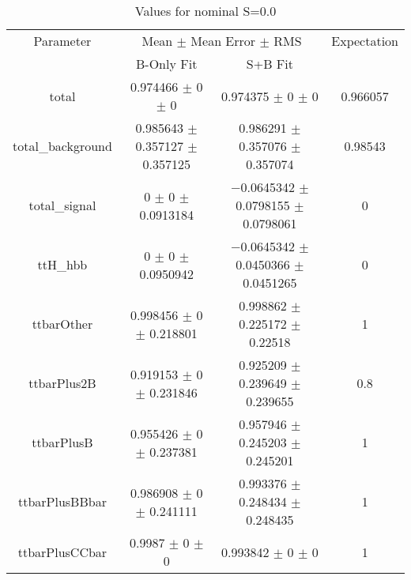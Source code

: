 \begin{table}
\centering
\caption{Values for nominal S=0.0}
\begin{tabular}{cccc}
\toprule
Parameter & \multicolumn{2}{c}{Mean $\pm$ Mean Error $\pm$ RMS} & Expectation\\
 & B-Only Fit & S+B Fit & \\
\midrule
total & \num{0.974466} $\pm$ \num{0} $\pm$ \num{0} & \num{0.974375} $\pm$ \num{0} $\pm$ \num{0} & \num{0.966057}\\
total\_background & \num{0.985643} $\pm$ \num{0.357127} $\pm$ \num{0.357125} & \num{0.986291} $\pm$ \num{0.357076} $\pm$ \num{0.357074} & \num{0.98543}\\
total\_signal & \num{0} $\pm$ \num{0} $\pm$ \num{0.0913184} & \num{-0.0645342} $\pm$ \num{0.0798155} $\pm$ \num{0.0798061} & \num{0}\\
ttH\_hbb & \num{0} $\pm$ \num{0} $\pm$ \num{0.0950942} & \num{-0.0645342} $\pm$ \num{0.0450366} $\pm$ \num{0.0451265} & \num{0}\\
ttbarOther & \num{0.998456} $\pm$ \num{0} $\pm$ \num{0.218801} & \num{0.998862} $\pm$ \num{0.225172} $\pm$ \num{0.22518} & \num{1}\\
ttbarPlus2B & \num{0.919153} $\pm$ \num{0} $\pm$ \num{0.231846} & \num{0.925209} $\pm$ \num{0.239649} $\pm$ \num{0.239655} & \num{0.8}\\
ttbarPlusB & \num{0.955426} $\pm$ \num{0} $\pm$ \num{0.237381} & \num{0.957946} $\pm$ \num{0.245203} $\pm$ \num{0.245201} & \num{1}\\
ttbarPlusBBbar & \num{0.986908} $\pm$ \num{0} $\pm$ \num{0.241111} & \num{0.993376} $\pm$ \num{0.248434} $\pm$ \num{0.248435} & \num{1}\\
ttbarPlusCCbar & \num{0.9987} $\pm$ \num{0} $\pm$ \num{0} & \num{0.993842} $\pm$ \num{0} $\pm$ \num{0} & \num{1}\\
\bottomrule
\end{tabular}
\end{table}